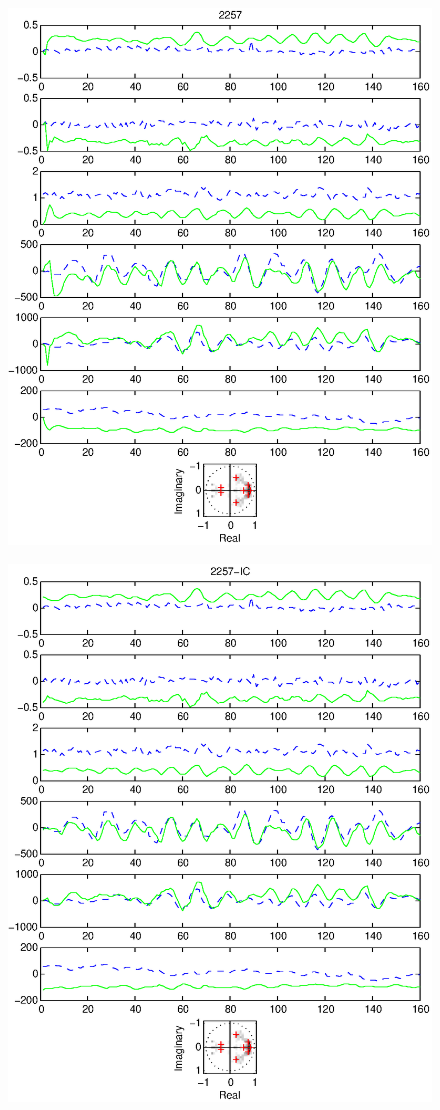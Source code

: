 \documentclass{article}
\begin{document}
\begin{figure}[htb!]\centering
\includegraphics{2257.eps}
\end{figure}\clearpage
\begin{figure}[htb!]\centering
\includegraphics{2257_ic.eps}
\end{figure}\clearpage
\end{document}
